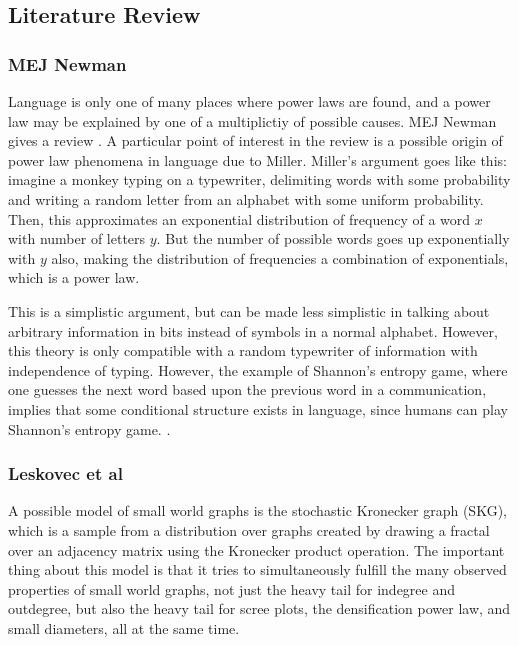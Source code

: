 \documentclass[12pt]{article}
\begin{document}
\subsection*{Literature Review}

\subsubsection*{MEJ Newman}

Language is only one of many places where power laws are found, and a power law may be explained by one of a multiplictiy of possible causes. MEJ Newman gives a review \cite{mejpowerlaw}. A particular point of interest in the review is a possible origin of power law phenomena in language due to Miller\cite{gamiller}. Miller's argument goes like this: imagine a monkey typing on a typewriter, delimiting words with some probability and writing a random letter from an alphabet with some uniform probability. Then, this approximates an exponential distribution of frequency of a word $x$ with number of letters $y$. But the number of possible words goes up exponentially with $y$ also, making the distribution of frequencies a combination of exponentials, which is a power law.

This is a simplistic argument, but can be made less simplistic in talking about arbitrary information in bits instead of symbols in a normal alphabet. However, this theory is only compatible with a random typewriter of information with independence of typing. However, the example of Shannon's entropy game, where one guesses the next word based upon the previous word in a communication, implies that some conditional structure exists in language, since humans can play Shannon's entropy game. \cite{shannon}
. 

\subsubsection*{Leskovec et al}

A possible model of small world graphs is the stochastic Kronecker graph (SKG)\cite{kronfit}, which is a sample from a distribution over graphs created by drawing a fractal over an adjacency matrix using the Kronecker product operation. The important thing about this model is that it tries to simultaneously fulfill the many observed properties of small world graphs, not just the heavy tail for indegree and outdegree, but also the heavy tail for scree plots, the densification power law, and small diameters, all at the same time.
\end{document}
